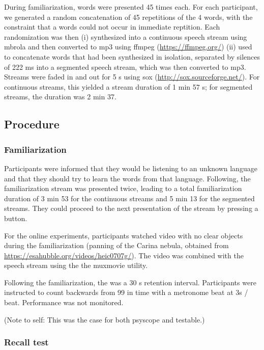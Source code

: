 \documentclass[]{article}
\begin{document}
During familiarization, words were presented 45 times each. For each
participant, we generated a random concatenation of 45 repetitions of
the 4 words, with the constraint that a words could not occur in
immediate reptition. Each randomization was then (i) synthesized into a
continuous speech stream using mbrola and then converted to mp3 using
ffmpeg (\url{https://ffmpeg.org/}) (ii) used to concatenate words that
had been synthesized in isolation, separated by silences of 222 ms into
a segmented speech stream, which was then converted to mp3. Streams were
faded in and out for 5 s using sox (\url{http://sox.sourceforge.net/}).
For continuous streams, this yielded a stream duration of 1 min 57 s;
for segmented streams, the duration was 2 min 37.

\subsection{Procedure}\label{procedure}

\subsubsection{Familiarization}\label{familiarization}

Participants were informed that they would be listening to an unknown
language and that they should try to learn the words from that language.
Following, the familiarization stream was presented twice, leading to a
total familiarization duration of 3 min 53 for the continuous streams
and 5 min 13 for the segmented streams. They could proceed to the next
presentation of the stream by pressing a button.

For the online experiments, participants watched video with no clear
objects during the familiarization (panning of the Carina nebula,
obtained from \url{https://esahubble.org/videos/heic0707g/}). The video
was combined with the speech stream using the the muxmovie utility.

Following the familiarization, the was a 30 s retention interval.
Participants were instructed to count backwards from 99 in time with a
metronome beat at 3s / beat. Performance was not monitored.

(Note to self: This was the case for both psyscope and testable.)

\subsubsection{Recall test}\label{recall-test}
\end{document}
